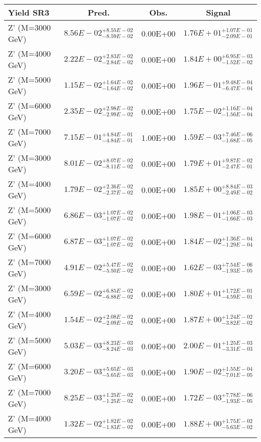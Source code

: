 \documentclass{article}
\begin{document}
 \begin{center}
 \begin{tabular}{ |l|c|c|c| } 
 \hline
 Yield SR3 & Pred. & Obs. & Signal \\
 \hline
 \hline
 Z' (M=3000 GeV) & $8.56E-02^{+8.55E-02}_{-8.59E-02}$ & 0.00E+00 & $1.76E+01^{+1.07E-01}_{-2.09E-01}$ \\
 \hline
 Z' (M=4000 GeV) & $2.22E-02^{+2.83E-02}_{-2.84E-02}$ & 0.00E+00 & $1.84E+00^{+6.95E-03}_{-1.52E-02}$ \\
 \hline
 Z' (M=5000 GeV) & $1.15E-02^{+1.64E-02}_{-1.64E-02}$ & 0.00E+00 & $1.96E-01^{+9.48E-04}_{-6.47E-04}$ \\
 \hline
 Z' (M=6000 GeV) & $2.35E-02^{+2.98E-02}_{-2.99E-02}$ & 0.00E+00 & $1.75E-02^{+1.16E-04}_{-1.56E-04}$ \\
 \hline
 Z' (M=7000 GeV) & $7.15E-01^{+4.84E-01}_{-4.84E-01}$ & 1.00E+00 & $1.59E-03^{+7.46E-06}_{-1.68E-05}$ \\
 \hline
 Z' (M=3000 GeV) & $8.01E-02^{+8.07E-02}_{-8.11E-02}$ & 0.00E+00 & $1.79E+01^{+9.87E-02}_{-2.47E-01}$ \\
 \hline
 Z' (M=4000 GeV) & $1.79E-02^{+2.36E-02}_{-2.37E-02}$ & 0.00E+00 & $1.85E+00^{+8.84E-03}_{-2.49E-02}$ \\
 \hline
 Z' (M=5000 GeV) & $6.86E-03^{+1.07E-02}_{-1.07E-02}$ & 0.00E+00 & $1.98E-01^{+1.06E-03}_{-1.66E-03}$ \\
 \hline
 Z' (M=6000 GeV) & $6.87E-03^{+1.07E-02}_{-1.07E-02}$ & 0.00E+00 & $1.84E-02^{+1.36E-04}_{-1.29E-04}$ \\
 \hline
 Z' (M=7000 GeV) & $4.91E-02^{+5.47E-02}_{-5.50E-02}$ & 0.00E+00 & $1.62E-03^{+7.54E-06}_{-1.93E-05}$ \\
 \hline
 Z' (M=3000 GeV) & $6.59E-02^{+6.85E-02}_{-6.88E-02}$ & 0.00E+00 & $1.80E+01^{+1.72E-01}_{-4.59E-01}$ \\
 \hline
 Z' (M=4000 GeV) & $1.54E-02^{+2.08E-02}_{-2.09E-02}$ & 0.00E+00 & $1.87E+00^{+1.24E-02}_{-3.82E-02}$ \\
 \hline
 Z' (M=5000 GeV) & $5.03E-03^{+8.23E-03}_{-8.24E-03}$ & 0.00E+00 & $2.00E-01^{+1.25E-03}_{-3.31E-03}$ \\
 \hline
 Z' (M=6000 GeV) & $3.20E-03^{+5.65E-03}_{-5.65E-03}$ & 0.00E+00 & $1.90E-02^{+1.55E-04}_{-7.01E-05}$ \\
 \hline
 Z' (M=7000 GeV) & $8.25E-03^{+1.25E-02}_{-1.25E-02}$ & 0.00E+00 & $1.72E-03^{+7.78E-06}_{-1.93E-05}$ \\
 \hline
 Z' (M=4000 GeV) & $1.32E-02^{+1.82E-02}_{-1.83E-02}$ & 0.00E+00 & $1.88E+00^{+1.75E-02}_{-5.63E-02}$ \\

\end{tabular}
\end{center}
\end{document}
